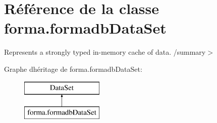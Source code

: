 \hypertarget{classforma_1_1formadb_data_set}{}\section{Référence de la classe forma.\+formadb\+Data\+Set}
\label{classforma_1_1formadb_data_set}


Represents a strongly typed in-\/memory cache of data. /summary$>$  


Graphe d\textquotesingle{}héritage de forma.\+formadb\+Data\+Set\+:\begin{figure}[H]
\begin{center}
\leavevmode
\includegraphics[height=2.000000cm]{classforma_1_1formadb_data_set}
\end{center}
\end{figure}
